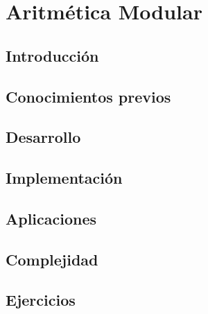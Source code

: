 \chapter{Aritmética Modular}
\section{Introducción}

\section{Conocimientos previos}

\section{Desarrollo}

\section{Implementación}

\section{Aplicaciones}

\section{Complejidad}

\section{Ejercicios}
